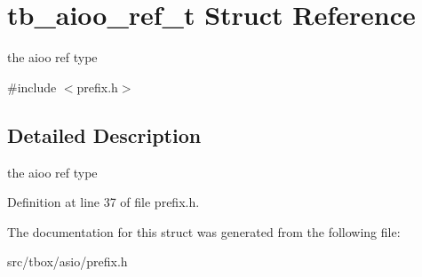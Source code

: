 \hypertarget{structtb__aioo__ref__t}{\section{tb\-\_\-aioo\-\_\-ref\-\_\-t Struct Reference}
\label{structtb__aioo__ref__t}
}


the aioo ref type  




{\ttfamily \#include $<$prefix.\-h$>$}



\subsection{Detailed Description}
the aioo ref type 

Definition at line 37 of file prefix.\-h.



The documentation for this struct was generated from the following file\-:\begin{DoxyCompactItemize}
\item 
src/tbox/asio/prefix.\-h\end{DoxyCompactItemize}
